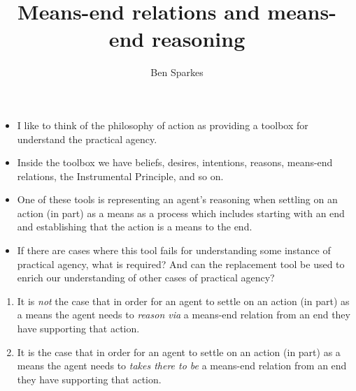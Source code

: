 \documentclass[10pt]{article}
\title{Means-end relations and means-end reasoning}
\author{Ben Sparkes}
\newcommand{\hozlinedash}[0]{%
  \noindent\hdashrule[0.5ex][c]{\textwidth}{.1pt}{2.5pt}
}
\begin{document}

\tableofcontents

\newpage

\maketitle



\hozlinedash



\begin{itemize}[noitemsep]
\item I like to think of the philosophy of action as providing a toolbox for understand the practical agency.
\item Inside the toolbox we have beliefs, desires, intentions, reasons, means-end relations, the Instrumental Principle, and so on.
\item One of these tools is representing an agent's reasoning when settling on an action (in part) as a means as a process which includes starting with an end and establishing that the action is a means to the end.
\item If there are cases where this tool fails for understanding some instance of practical agency, what is required?
  And can the replacement tool be used to enrich our understanding of other cases of practical agency?
\end{itemize}

\hozlinedash

\begin{enumerate}[label=\Alph*, ref=(\Alph*)]
\item It is \emph{not} the case that in order for an agent to settle on an action (in part) as a means the agent needs to \emph{reason via} a means-end relation from an end they have supporting that action.
\item It is the case that in order for an agent to settle on an action (in part) as a means the agent needs to \emph{takes there to be} a means-end relation from an end they have supporting that action.
\end{enumerate}
\end{document}
